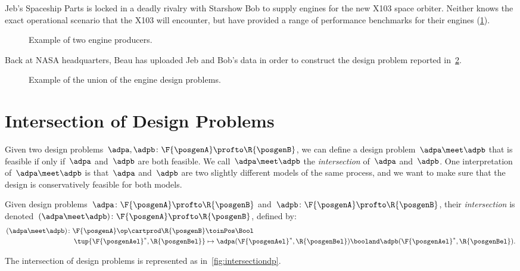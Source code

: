 \begin{example}
    Jeb's Spaceship Parts is locked in a deadly rivalry with Starshow Bob to supply engines for the new X103 space orbiter.
    Neither knows the exact operational scenario that the X103 will encounter, but have provided a range of performance benchmarks for their engines (\cref{fig:exunion_1}).
    \begin{figure}[h!]
        \centering
        \caption{Example of two engine producers. }
        \label{fig:exunion_1}
    \end{figure}
    Back at NASA headquarters, Beau has uploaded Jeb and Bob's data in order to construct the design problem reported in~\cref{fig:exunion_2}.
    \begin{figure}[h!]
        \centering
        \caption{Example of the union of the engine design problems. }
        \label{fig:exunion_2}
    \end{figure}
\end{example}

\section{Intersection of Design Problems}

Given two design problems~$\adpa, \adpb \colon \F{\posgenA} \profto \R{\posgenB}$, we can define a design problem~$\adpa \meet \adpb$ that is feasible if only if~$\adpa$ and~$\adpb$ are both feasible.
We call~$\adpa \meet \adpb$ the \emph{intersection} of~$\adpa$ and~$\adpb$.
One interpretation of~$\adpa \meet \adpb$ is that~$\adpa$ and~$\adpb$ are two slightly different models of the same process, and we want to make sure that the design is conservatively feasible for both models.

\begin{definition}
    \label{def:intersection_dp}
    \label{def:dp-intersection}
    Given design problems~$\adpa\colon \F{\posgenA} \profto \R{\posgenB}$ and~$\adpb\colon \F{\posgenA} \profto \R{\posgenB}$,
    their \emph{intersection} is denoted~$(\adpa \meet \adpb)\colon \F{\posgenA} \profto \R{\posgenB}$, defined by:
    \begin{equation}
        \begin{aligned}
            (\adpa \meet \adpb)
            \colon \F{\posgenA}\op \cartprod \R{\posgenB} & \toinPos \Bool                                                                                     \\
            \tup{\F{\posgenAel}^*, \R{\posgenBel}}        & \mapsto \adpa(\F{\posgenAel}^*, \R{\posgenBel}) \booland  \adpb(\F{\posgenAel}^*, \R{\posgenBel}).
        \end{aligned}
    \end{equation}
\end{definition}
The intersection of design problems is represented as in~\cref{fig:intersectiondp}.

